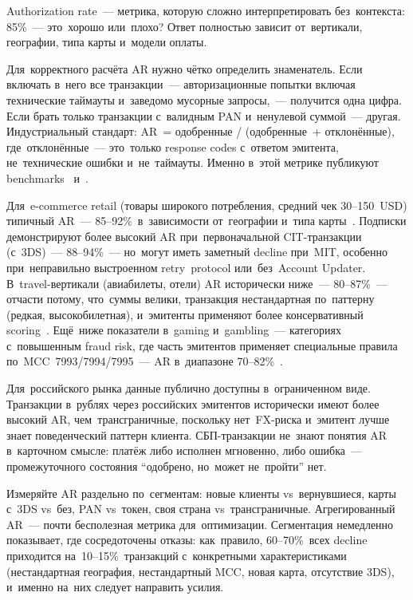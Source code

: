 Authorization rate~--- метрика, которую сложно интерпретировать без~контекста:
85\%~--- это~хорошо или~плохо? Ответ полностью зависит от~вертикали,
географии, типа карты и~модели оплаты.

Для~корректного расчёта AR нужно чётко определить знаменатель. Если включать
в~него все транзакции~--- авторизационные попытки включая технические таймауты
и~заведомо мусорные запросы,~--- получится одна цифра. Если брать только
транзакции с~валидным PAN и~ненулевой суммой~--- другая. Индустриальный
стандарт: AR~= одобренные / (одобренные~+ отклонённые), где~отклонённые~---
это~только response codes с~ответом эмитента, не~технические ошибки
и~не~таймауты. Именно в~этой метрике публикуют benchmarks~
и~.

Для~e-commerce retail (товары широкого потребления, средний чек
30--150~USD) типичный AR~--- 85--92\%~в~зависимости от~географии и~типа
карты~.
Подписки демонстрируют более высокий AR при~первоначальной
CIT-транзакции (с~3DS)~--- 88--94\%~--- но~могут иметь заметный decline
при~MIT, особенно при~неправильно выстроенном retry~protocol или~без~Account
Updater. В~travel-вертикали (авиабилеты, отели) AR исторически ниже~---
80--87\%~--- отчасти потому, что~суммы велики, транзакция нестандартная
по~паттерну (редкая, высокобилетная), и~эмитенты применяют более консервативный
scoring~. Ещё~ниже показатели
в~gaming и~gambling~--- категориях с~повышенным fraud risk, где часть
эмитентов применяет специальные правила по~MCC~7993/7994/7995~--- AR
в~диапазоне 70--82\%~.

Для~российского рынка данные публично доступны в~ограниченном виде.
Транзакции в~рублях через российских эмитентов исторически имеют более
высокий AR, чем~трансграничные, поскольку нет~FX-риска и~эмитент лучше
знает поведенческий паттерн клиента. СБП-транзакции не~знают понятия AR
в~карточном смысле: платёж либо исполнен мгновенно, либо ошибка~---
промежуточного состояния \enquote{одобрено, но~может не~пройти} нет.

\begin{practice}
  Измеряйте AR раздельно по~сегментам: новые клиенты vs~вернувшиеся,
  карты с~3DS vs~без, PAN vs~токен, своя страна vs~трансграничные. Агрегированный
  AR~--- почти бесполезная метрика для~оптимизации. Сегментация немедленно
  показывает, где сосредоточены отказы: как~правило, 60--70\%~всех decline
  приходится на~10--15\%~транзакций с~конкретными характеристиками
  (нестандартная география, нестандартный MCC, новая карта, отсутствие
  3DS), и~именно на~них следует направить усилия.
\end{practice}


